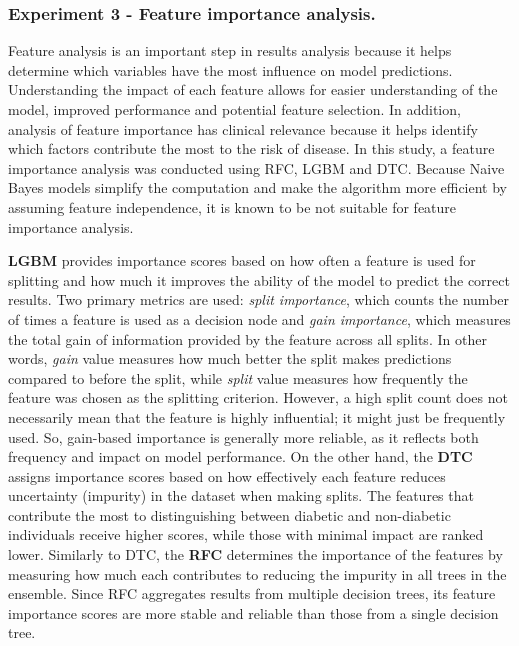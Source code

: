 \documentclass[runningheads]{llncs}
\begin{document}
\subsubsection{Experiment 3 - Feature importance analysis.}

Feature analysis is an important step in results analysis because it helps determine which variables have the most influence on model predictions. Understanding the impact of each feature allows for easier understanding of the model, improved performance and potential feature selection. In addition, analysis of feature importance has clinical relevance because it helps identify which factors contribute the most to the risk of disease.
In this study, a feature importance analysis was conducted using RFC, LGBM and DTC. 
Because Naive Bayes models simplify the computation and make the algorithm more efficient by assuming feature independence, it is known to be not suitable for feature importance analysis.

\textbf{LGBM} provides importance scores based on how often a feature is used for splitting and how much it improves the ability of the model to predict the correct results. Two primary metrics \cite{lightGBM} are used: \textit{split importance}, which counts the number of times a feature is used as a decision node and \textit{gain importance}, which measures the total gain of information provided by the feature across all splits. In other words, \textit{gain} value measures how much better the split makes predictions compared to before the split, while \textit{split} value measures how frequently the feature was chosen as the splitting criterion. However, a high split count does not necessarily mean that the feature is highly influential; it might just be frequently used. So, gain-based importance is generally more reliable, as it reflects both frequency and impact on model performance. 
On the other hand, the \textbf{DTC} assigns importance scores based on how effectively each feature reduces uncertainty (impurity) in the dataset when making splits. The features that contribute the most to distinguishing between diabetic and non-diabetic individuals receive higher scores, while those with minimal impact are ranked lower. 
Similarly to DTC, the \textbf{RFC} determines the importance of the features by measuring how much each contributes to reducing the impurity in all trees in the ensemble. Since RFC aggregates results from multiple decision trees, its feature importance scores are more stable and reliable than those from a single decision tree.
\end{document}
